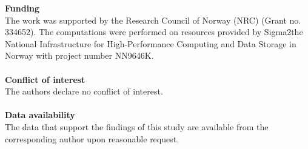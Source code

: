 \documentclass[a4paper,fleqn]{cas-sc}
\begin{document}
	{\noindent \bf{Funding}} \\
	
	The work was supported by the Research Council of Norway (NRC) (Grant no. 334652). The computations were performed on resources provided by Sigma2\textemdash the National Infrastructure for High-Performance Computing and Data Storage in Norway with project number NN9646K.\\
	\\
	{\bf{Conflict of interest}} \\
	
	The authors declare no conflict of interest. \\
	\\
	{\bf{Data availability}} \\
	

	The data that support the findings of this study are available from the corresponding author upon reasonable request. \\
	
\nolinenumbers



	
	
\end{document}
